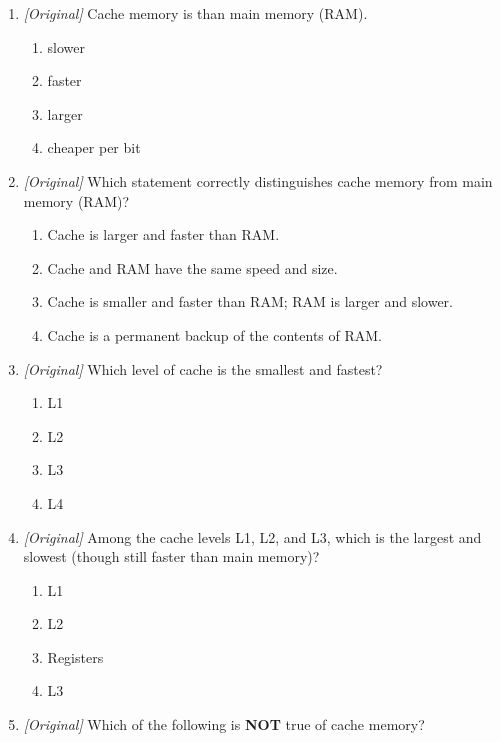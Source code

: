 \documentclass[11pt]{article}
\begin{document}
\begin{enumerate}[label=\textbf{Q\arabic*.}, leftmargin=*]
\begin{enumerate}[label=\Alph*.]
    \item Solid-state drive (SSD)
    \item Registers
  \end{enumerate}
\item \textit{[Original]} Cache memory is \underline{\hspace{2.2cm}} than
  main memory (RAM).
  \begin{enumerate}[label=\Alph*.]
    \item slower
    \item faster
    \item larger
    \item cheaper per bit
  \end{enumerate}
\item \textit{[Original]} Which statement correctly distinguishes cache
  memory from main memory (RAM)?
  \begin{enumerate}[label=\Alph*.]
    \item Cache is larger and faster than RAM.
    \item Cache and RAM have the same speed and size.
    \item Cache is smaller and faster than RAM; RAM is larger and slower.
    \item Cache is a permanent backup of the contents of RAM.
  \end{enumerate}
\item \textit{[Original]} Which level of cache is the smallest and fastest?
  \begin{enumerate}[label=\Alph*.]
    \item L1
    \item L2
    \item L3
    \item L4
  \end{enumerate}
\item \textit{[Original]} Among the cache levels L1, L2, and L3, which is the
  largest and slowest (though still faster than main memory)?
  \begin{enumerate}[label=\Alph*.]
    \item L1
    \item L2
    \item Registers
    \item L3
  \end{enumerate}
\item \textit{[Original]} Which of the following is \textbf{NOT} true of
  cache memory?
  \begin{enumerate}[label=\Alph*.]

\end{enumerate}
\end{enumerate}
\end{document}
